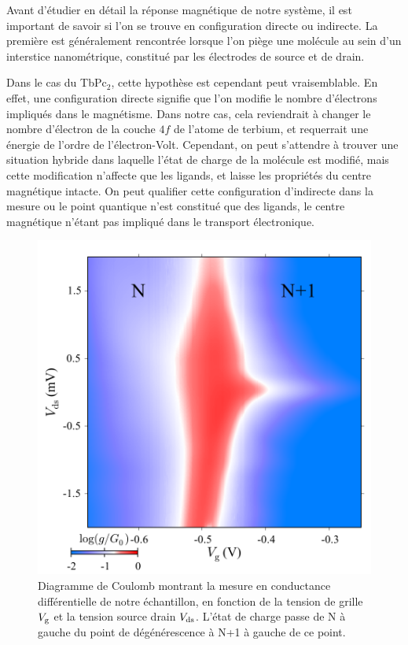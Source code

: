 Avant d'étudier en détail la réponse magnétique de notre système, il est important de savoir si l'on se trouve en configuration directe ou indirecte. La première est généralement rencontrée lorsque l'on piège une molécule au sein d'un interstice nanométrique, constitué par les électrodes de source et de drain.

Dans le cas du TbPc$_{2}$, cette hypothèse est cependant peut vraisemblable. En effet, une configuration directe signifie que l'on modifie le nombre d'électrons impliqués dans le magnétisme. Dans notre cas, cela reviendrait à changer le nombre d'électron de la couche $4f$ de l'atome de terbium, et requerrait une énergie de l'ordre de l'électron-Volt. Cependant, on peut s'attendre à trouver une situation hybride dans laquelle l'état de charge de la molécule est modifié, mais cette modification n'affecte que les ligands, et laisse les propriétés du centre magnétique intacte. On peut qualifier cette configuration d'indirecte dans la mesure ou le point quantique n'est constitué que des ligands, le centre magnétique n'étant pas impliqué dans le transport électronique.

\begin{figure}
\parbox{7cm}{
\includegraphics[scale=0.45]{Resultats/CoulombMap/CoulombMap.pdf} 
}
\parbox{6.5cm}{\caption{Diagramme de Coulomb montrant la mesure en conductance différentielle de notre échantillon, en fonction de la tension de grille $V_{\rm{g}}$ et la tension source drain $V_{\rm{ds}}$. L'état de charge passe de N à gauche du point de dégénérescence à N+1 à gauche de ce point.}
\label{coulomb_map}
}
\end{figure}

